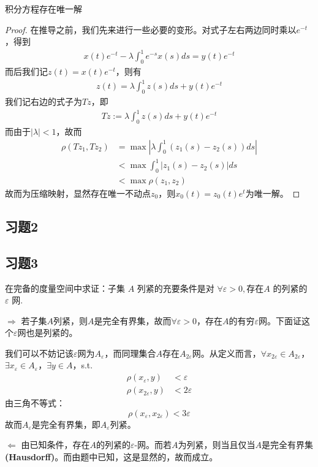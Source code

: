 \begin{exercise}
    积分方程存在唯一解
\end{exercise}
\begin{proof}
    在推导之前，我们先来进行一些必要的变形。对式子左右两边同时乘以$e^{-t}$，得到
    \begin{align*}
        x(t)e^{-t} -\lambda\int_0^1 e^{-s}x(s)ds = y(t)e^{-t}
    \end{align*}
    而后我们记$z(t) = x(t)e^{-t}$，则有
    \begin{align*}
        z(t) = \lambda\int_0^1 z(s)ds + y(t)e^{-t}
    \end{align*}
    我们记右边的式子为$Tz$，即
    \begin{align*}
        Tz:= \lambda\int_0^1 z(s)ds + y(t)e^{-t}
    \end{align*}
    而由于$|\lambda|<1$，故而
    \begin{align*}
        \rho(Tz_1, Tz_2) &= \max \left|\lambda \int_0^1\left( z_1(s) - z_2(s)\right) ds\right| \\
        & < \max \int_0^1 \left| z_1(s)-z_2(s)\right| ds\\
        & < \max \rho(z_1, z_2)
    \end{align*}
    故而为压缩映射，显然存在唯一不动点$z_0$，则$x_0(t) = z_0(t)e^t$为唯一解。
\end{proof}

\subsection{习题2}

\subsection{习题3}
\begin{exercise}
    在完备的度量空间中求证：子集 $A$ 列紧的充要条件是对 $\forall\varepsilon> 0, $存在$A$ 的列紧的 $\varepsilon$ 网.
\end{exercise}
\begin{solution}
    $\Longrightarrow$ 若子集$A$列紧，则$A$是完全有界集，故而$\forall \varepsilon>0$，存在$A$的有穷$\varepsilon$网。下面证这个$\varepsilon$网也是列紧的。

    我们可以不妨记该$\varepsilon$网为$A_{\varepsilon}$，而同理集合$A$存在$A_{2\varepsilon}$网。从定义而言，$\forall x_{2\varepsilon}\in A_{2\varepsilon}$，$\exists x_{\varepsilon}\in A_{\varepsilon}$，$\exists y \in A$，s.t.
    \begin{align*}
        \rho(x_{\varepsilon}, y) &< \varepsilon \\
        \rho(x_{2\varepsilon}, y) &< 2\varepsilon 
    \end{align*}
    由三角不等式：
    \begin{equation}
        \rho(x_{\varepsilon}, x_{2\varepsilon}) < 3\varepsilon \nonumber
    \end{equation}
    故而$A_{\varepsilon}$是完全有界集，即$A_{\varepsilon}$列紧。
    
    $\Longleftarrow$ 由已知条件，存在$A$的列紧的$\varepsilon$-网。而若$A$为列紧，则当且仅当$A$是完全有界集\textbf{(Hausdorff)}。而由题中已知，这是显然的，故而成立。
\end{solution}

